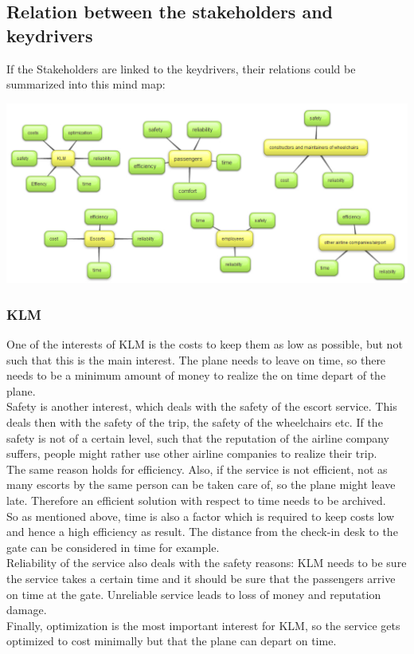 \documentclass[a4paper, 12pt, notitlepage]{report}
\begin{document}
\subsection{Relation between the stakeholders and keydrivers}
If the Stakeholders are linked to the keydrivers, their relations could be summarized into this mind map:
\begin{center}
\includegraphics[scale=0.4]{figures/relationstakeholders.jpg}
\end{center}
\subsubsection{KLM}
One of the interests of KLM is the costs to keep them as low as possible, but not such that this is the main interest. The plane needs to leave on time, so there needs to be a minimum amount of money to realize the on time depart of the plane.\\
Safety is another interest, which deals with the safety of the escort service. This deals then with the safety of the trip, the safety of the wheelchairs etc. If the safety is not of a certain level, such that the reputation of the airline company suffers, people might rather use other airline companies to realize their trip.\\
The same reason holds for efficiency. Also, if the service is not efficient, not as many escorts by the same person can be taken care of, so the plane might leave late. Therefore an efficient solution with respect to time needs to be archived.\\
So as mentioned above, time is also a factor which is required to keep costs low and hence a high efficiency as result. The distance from the check-in desk to the gate can be considered in time for example.\\
Reliability of the service also deals with the safety reasons: KLM needs to be sure the service takes a certain time and it should be sure that the passengers arrive on time at the gate. Unreliable service leads to loss of money and reputation damage.\\
Finally, optimization is the most important interest for KLM, so the service gets optimized to cost minimally but that the plane can depart on time.
\end{document}
